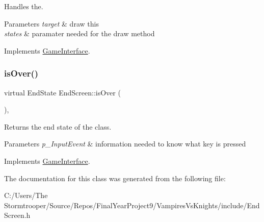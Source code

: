 Handles the. 


\begin{DoxyParams}{Parameters}
{\em target} & draw this \\
\hline
{\em states} & paramater needed for the draw method \\
\hline
\end{DoxyParams}


Implements \mbox{\hyperlink{class_game_interface_a48b4f6059c14c79359d30b77016a28f0}{Game\+Interface}}.

\mbox{\label{class_end_screen_acd13799a074bb1984352a5262c3e3f29}} 
\subsubsection{\texorpdfstring{is\+Over()}{isOver()}}
{\footnotesize\ttfamily virtual End\+State End\+Screen\+::is\+Over (\begin{DoxyParamCaption}{ }\end{DoxyParamCaption})\hspace{0.3cm}{\ttfamily [override]}, {\ttfamily [virtual]}}



Returns the end state of the class. 


\begin{DoxyParams}{Parameters}
{\em p\+\_\+\+Input\+Event} & information needed to know what key is pressed \\
\hline
\end{DoxyParams}


Implements \mbox{\hyperlink{class_game_interface_a5bad60f237214cb1ec013e221ed16f45}{Game\+Interface}}.



The documentation for this class was generated from the following file\+:\begin{DoxyCompactItemize}
\item 
C\+:/\+Users/\+The Stormtrooper/\+Source/\+Repos/\+Final\+Year\+Project9/\+Vampires\+Vs\+Knights/include/End\+Screen.\+h\end{DoxyCompactItemize}
